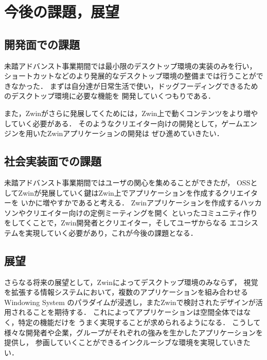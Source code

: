 \section{今後の課題，展望}

\subsection{開発面での課題}

未踏アドバンスト事業期間では最小限のデスクトップ環境の実装のみを行い，
ショートカットなどのより発展的なデスクトップ環境の整備までは行うことができなかった．
まずは自分達が日常生活で使い，ドッグフーディングできるためのデスクトップ環境に必要な機能を
開発していくつもりである．

また，Zwinがさらに発展してくためには，Zwin上で動くコンテンツをより増やしていく必要がある．
そのようなクリエイター向けの開発として，ゲームエンジンを用いたZwinアプリケーションの開発は
ぜひ進めていきたい．

\subsection{社会実装面での課題}

未踏アドバンスト事業期間ではユーザの関心を集めることができたが，
OSSとしてZwinが発展していく鍵はZwin上でアプリケーションを作成するクリエイターを
いかに増やすかであると考える．
Zwinアプリケーションを作成するハッカソンやクリエイター向けの定例ミーティングを開く
といったコミュニティ作りをしてくことで，Zwin開発者とクリエイター，そしてユーザからなる
エコシステムを実現していく必要があり，これが今後の課題となる．

\subsection{展望}

さらなる将来の展望として，Zwinによってデスクトップ環境のみならず，
視覚を拡張する情報システムにおいて，複数のアプリケーションを組み合わせるWindowing System
のパラダイムが浸透し，またZwinで検討されたデザインが活用されることを期待する．
これによってアプリケーションは空間全体ではなく，特定の機能だけを
うまく実現することが求められるようになる．
こうして様々な開発者や企業，グループがそれぞれの強みを生かしたアプリケーションを提供し，
参画していくことができるインクルーシブな環境を実現していきたい．
